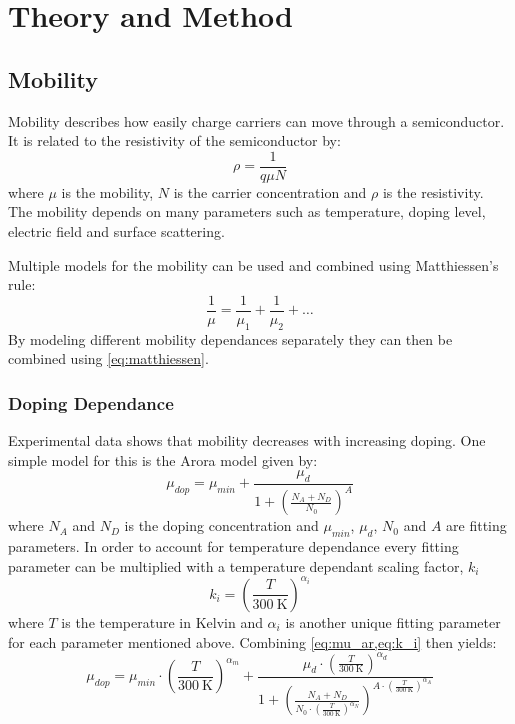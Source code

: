\section{Theory and Method}

\subsection{Mobility}
Mobility describes how easily charge carriers can move through a semiconductor. It is related to the resistivity of the semiconductor by:
\begin{equation} \label{eq:res_mu}
\rho = \frac{1}{q \mu N}
\end{equation}
where $\mu$ is the mobility, $N$ is the carrier concentration and $\rho$ is the resistivity. The mobility depends on many parameters such as temperature, doping level, electric field and surface scattering. \cite{Baliga2019}


Multiple models for the mobility can be used and combined using Matthiessen's rule:
\begin{equation} \label{eq:matthiessen}
    \frac{1}{\mu} = \frac{1}{\mu_1} + \frac{1}{\mu_2} + \dots 
\end{equation}
By modeling different mobility dependances separately they can then be combined using \cref{eq:matthiessen}.

\subsubsection{Doping Dependance}
Experimental data shows that mobility decreases with increasing doping. One simple model for this is the Arora model given by:
\begin{equation} \label{eq:mu_ar}
    \mu_{dop} = \mu_{min} + \frac{\mu_d}{1 + \left(\frac{N_A + N_D}{N_0}\right)^A}
\end{equation}
where $N_A$ and $N_D$ is the doping concentration and $\mu_{min}$, $\mu_d$, $N_0$ and $A$ are fitting parameters. In order to account for temperature dependance every fitting parameter can be multiplied with a temperature dependant scaling factor, $k_i$
\begin{equation} \label{eq:k_i}
    k_i = \left(\frac{T}{\SI{300}{\kelvin}}\right)^{\alpha_i}
\end{equation}
where $T$ is the temperature in Kelvin and $\alpha_i$ is another unique fitting parameter for each parameter mentioned above. Combining \cref{eq:mu_ar,eq:k_i} then yields:
\begin{equation} \label{eq:mu_ar_full}
    \mu_{dop} = \mu_{min} \cdot \left( \frac{T}{\SI{300}{\kelvin}} \right)^{\alpha_m} + %
    \frac{\mu_d \cdot \left( \frac{T}{\SI{300}{\kelvin}} \right)^{\alpha_d}} %
    {1 + \left( \frac{N_A + N_D}{N_0 \cdot \left( \frac{T}{\SI{300}{\kelvin}} \right)^{\alpha_N}} \right)^{A \cdot \left( \frac{T}{\SI{300}{\kelvin}} \right)^{\alpha_A}}}
\end{equation}

